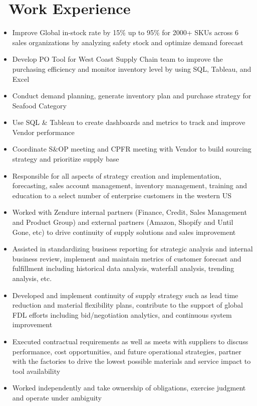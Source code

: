 \documentclass{resume}
\begin{document}
\section{%
        \texorpdfstring{\faUsers\ Work Experience}%
                        {-{}--Work Experience}}
\begin{itemize}
  \item Improve Global in-stock rate by 15\% up to 95\% for 2000+ SKUs across 6 sales organizations by analyzing safety stock and optimize demand forecast
  \item Develop PO Tool for West Coast Supply Chain team to improve the purchasing efficiency and monitor inventory level by using SQL, Tableau, and Excel
  \item Conduct demand planning, generate inventory plan and purchase strategy for Seafood Category
  \item Use SQL \& Tableau to create dashboards and metrics to track and improve Vendor performance
  \item Coordinate S\&OP meeting and CPFR meeting with Vendor to build sourcing strategy and prioritize supply base
\end{itemize}

\begin{itemize}
  \item Responsible for all aspects of strategy creation and implementation, forecasting, sales account management, inventory management, training and education to a select number of enterprise customers in the western US
  \item Worked with Zendure internal partners (Finance, Credit, Sales Management and Product Group) and external partners (Amazon, Shopify and Until Gone, etc) to drive continuity of supply solutions and sales improvement
  \item Assisted in standardizing business reporting for strategic analysis and internal business review, implement and maintain metrics of customer forecast and fulfillment including historical data analysis, waterfall analysis, trending analysis, etc.
  \item Developed and implement continuity of supply strategy such as lead time reduction and material flexibility plans, contribute to the support of global FDL efforts including bid/negotiation analytics, and continuous system improvement
  \item Executed contractual requirements as well as meets with suppliers to discuss performance, cost opportunities, and future operational strategies, partner with the factories to drive the lowest possible materials and service impact to tool availability
  \item Worked independently and take ownership of obligations, exercise judgment and operate under ambiguity
\end{itemize}
\end{document}
